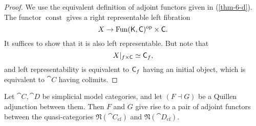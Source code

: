 \begin{proof}
    We use the equivalent definition of adjoint functors given in (\ref{thm-6-d}).
    The functor $\operatorname{const}$ gives a right representable left fibration 
    \[ X \to \operatorname{Fun}(\textup{\textsf{K}},\textup{\textsf{C}})^{\mathrm{op}} \times \textup{\textsf{C}}. \]
    It suffices to show that it is also left representable.
    But note that 
    \[ X|_{f\times\textup{\textsf{C}}} \simeq \textup{\textsf{C}}_{f\/}, \]
    and left representability is equivalent to $\textup{\textsf{C}}_{f\/}$ having an initial object,
    which is equivalent to $\cat{C}$ having colimits.
\end{proof}

\begin{remark}
    Let $\cat C,\cat D$ be simplicial model categories,
    and let $(F\dashv G)$ be a Quillen adjunction between them.
    Then $F$ and $G$ give rise to 
    a pair of adjoint functors between the quasi-categories
    $\mathfrak N(\cat C_{\mathrm{cf}})$ and
    $\mathfrak N(\cat D_{\mathrm{cf}})$. \varqed
\end{remark}

